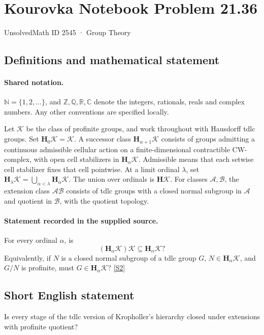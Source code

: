 \documentclass[11pt]{article}
\newcommand{\sref}[2]{\hyperlink{source:#1:#2}{[S#2]}}
\begin{document}
\setcounter{section}{2544}
\section{Kourovka Notebook Problem 21.36}\label{2545}
{\small\sffamily UnsolvedMath ID 2545 · Group Theory}
\subsection{Definitions and mathematical statement}

\paragraph{Shared notation.}$\mathbb N=\{1,2,\ldots\}$, and $\mathbb Z,\mathbb Q,\mathbb R,\mathbb C$ denote the integers, rationals, reals and complex numbers. Any other conventions are specified locally.


Let $\mathcal K$ be the class of profinite groups, and work throughout with Hausdorff tdlc groups. Set $\mathbf H_0\mathcal K=\mathcal K$. A successor class $\mathbf H_{\alpha+1}\mathcal K$ consists of groups admitting a continuous admissible cellular action on a finite-dimensional contractible CW-complex, with open cell stabilizers in $\mathbf H_\alpha\mathcal K$. Admissible means that each setwise cell stabilizer fixes that cell pointwise. At a limit ordinal $\lambda$, set $\mathbf H_\lambda\mathcal K=\bigcup_{\alpha<\lambda}\mathbf H_\alpha\mathcal K$. The union over ordinals is $\mathbf H\mathcal K$. For classes $\mathcal A,\mathcal B$, the extension class $\mathcal A\mathcal B$ consists of tdlc groups with a closed normal subgroup in $\mathcal A$ and quotient in $\mathcal B$, with the quotient topology.
\paragraph{Statement recorded in the supplied source.}
For every ordinal $\alpha$, is
\[
 (\mathbf H_\alpha\mathcal K)\mathcal K\subseteq\mathbf H_\alpha\mathcal K?
\]
Equivalently, if $N$ is a closed normal subgroup of a tdlc group $G$, $N\in\mathbf H_\alpha\mathcal K$, and $G/N$ is profinite, must $G\in\mathbf H_\alpha\mathcal K$? \sref{2545}{2}
\subsection{Short English statement}
Is every stage of the tdlc version of Kropholler’s hierarchy closed under extensions with profinite quotient?
\end{document}
